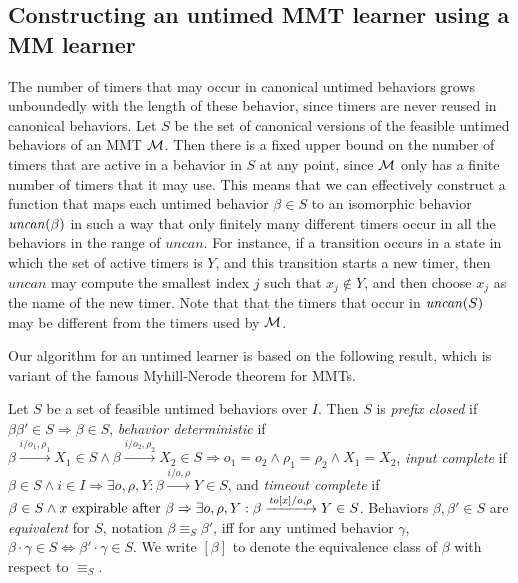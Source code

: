 \subsection{Constructing an untimed MMT learner using a MM learner}
The number of timers that may occur in canonical untimed behaviors grows unboundedly with the length of these behavior,
since timers are never reused in canonical behaviors.
Let $S$ be the set of canonical versions of the feasible untimed behaviors of an MMT ${\mathcal M}$.
Then there is a fixed upper bound on the number of timers that are active in a behavior in $S$ at any point,
since ${\mathcal M}$ only has a finite number of timers that it may use.
This means that we can effectively construct a function that maps each untimed behavior $\beta \in S$
to an isomorphic behavior $\mathit{uncan}({\beta})$ in such a way that only finitely many
different timers occur in all the behaviors in the range of $\mathit{uncan}$.
For instance, if a transition occurs in a state in which the set of active timers is $Y$, and this transition
starts a new timer, then $\mathit{uncan}$ may compute the smallest index $j$
such that $x_j \not\in Y$, and then choose $x_j$ as the name of the new timer.
Note that that the timers that occur in $\mathit{uncan}({S})$ may be different from the timers used by ${\mathcal M}$.

Our algorithm for an untimed learner is based on the following result, which is variant of the famous 
Myhill-Nerode theorem for MMTs.

\begin{definition}
\label{def:nerode}
Let $S$ be a set of feasible untimed behaviors over $I$. Then $S$ is
\emph{prefix closed} if $\beta \beta' \in S \Rightarrow \beta \in S$,
\emph{behavior deterministic} if
$\beta \xrightarrow{i/o_1, \rho_1} X_1 \in S \wedge \beta \xrightarrow{i/o_2, \rho_2} X_2 \in S \Rightarrow o_1 = o_2 \wedge \rho_1 = \rho_2 \wedge X_1 = X_2$,
\emph{input complete} if
$\beta \in S \wedge i \in I \Rightarrow \exists o, \rho, Y : \beta \xrightarrow{i/o, \rho} Y \in S$,
and
\emph{timeout complete} if
$\beta \in S \wedge x \mbox{ expirable after } \beta \Rightarrow
\exists o, \rho, Y: \beta \xrightarrow{\mathit{to}[x]/o, \rho} Y \in S$.
Behaviors $\beta, \beta' \in S$ are \emph{equivalent} for $S$, notation $\beta \equiv_S \beta'$, iff 
for any untimed behavior
$\gamma$, $\beta \cdot \gamma \in S \Leftrightarrow \beta' \cdot \gamma \in S$.
We write $[\beta]$ to denote the equivalence class of $\beta$ with respect to $\equiv_S$.
\end{definition}

